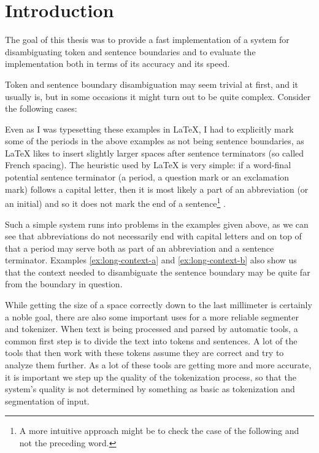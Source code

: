 \chapter*{Introduction}

The goal of this thesis was to provide a fast implementation of a system for
disambiguating token and sentence boundaries and to evaluate the
implementation both in terms of its accuracy and its speed.

Token and sentence boundary disambiguation may seem trivial at first, and it
usually is, but in some occasions it might turn out to be quite complex.
Consider the following cases:

\begin{exe}
\end{exe}

Even as I was typesetting these examples in \LaTeX{}, I had to explicitly mark
some of the periods in the above examples as not being sentence boundaries, as
\LaTeX{} likes to insert slightly larger spaces after sentence terminators (so
called French spacing). The heuristic used by \LaTeX{} is very simple: if a
word-final potential sentence terminator (a period, a question mark or an
exclamation mark) follows a capital letter, then it is most likely a part of
an abbreviation (or an initial) and so it does not mark the end of a
sentence\footnote{A more intuitive approach might be to check the case of the
following and not the preceding word.} \cite{web-latex}.

Such a simple system runs into problems in the examples given above, as we
can see that abbreviations do not necessarily end with capital letters and on
top of that a period may serve both as part of an abbreviation and a sentence
terminator. Examples \ref{ex:long-context-a} and \ref{ex:long-context-b} also
show us that the context needed to disambiguate the sentence boundary may be
quite far from the boundary in question.

While getting the size of a space correctly down to the last millimeter is
certainly a noble goal, there are also some important uses for a more reliable
segmenter and tokenizer. When text is being processed and parsed by automatic
tools, a common first step is to divide the text into tokens and sentences. A
lot of the tools that then work with these tokens assume they are correct and
try to analyze them further. As a lot of these tools are getting more and more
accurate, it is important we step up the quality of the tokenization process,
so that the system's quality is not determined by something as basic as
tokenization and segmentation of input. 

